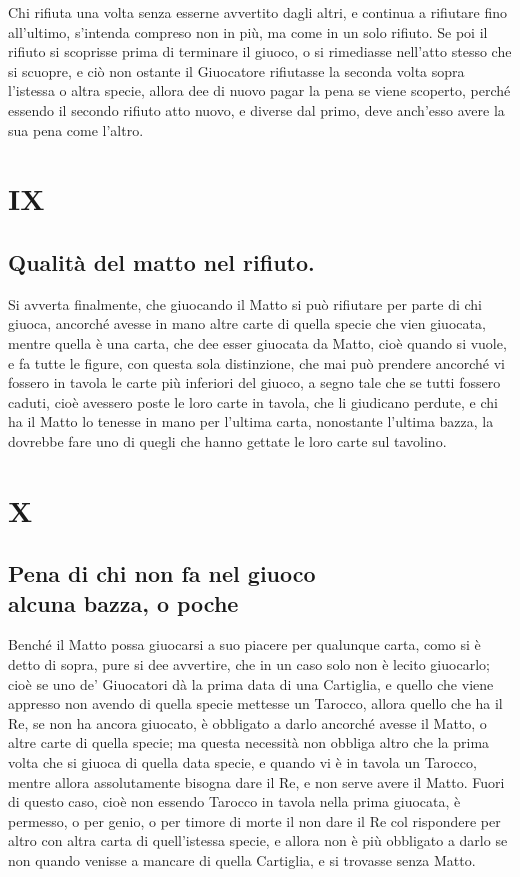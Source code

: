 \documentclass[11pt,a6paper]{article}
\begin{document}
Chi rifiuta una volta senza esserne avvertito dagli altri, e continua a rifiutare fino all'ultimo, s'intenda compreso
non in più, ma come in un solo rifiuto. Se poi il rifiuto si scoprisse prima di terminare il giuoco, o si rimediasse nell'atto stesso che si scuopre, e ciò non ostante il Giuocatore rifiutasse la seconda volta sopra l'istessa o altra specie, allora dee di nuovo pagar la pena se viene scoperto, perché essendo il secondo rifiuto atto nuovo, e diverse dal primo, deve anch'esso avere la sua pena come l'altro.

\section{IX}
\subsection*{Qualità del matto nel rifiuto.}

Si avverta finalmente, che giuocando
il Matto si può rifiutare per parte di chi giuoca, ancorché avesse in mano altre carte di quella specie che vien giuocata, mentre quella è una carta,
che dee esser giuocata da Matto, cioè quando si vuole, e fa tutte le figure, con questa sola distinzione, che mai può prendere ancorché vi fossero in tavola le carte più inferiori del giuoco, a segno tale
che se tutti fossero caduti, cioè avessero poste le loro carte in tavola, che li giudicano perdute, e chi ha il Matto lo tenesse in mano per l'ultima carta, nonostante l'ultima bazza, la dovrebbe fare uno di quegli che hanno gettate le loro carte sul tavolino.

\section{X}
\subsection*{Pena di chi non fa nel giuoco\\
  alcuna bazza, o poche}

Benché il Matto possa giuocarsi a suo
piacere per qualunque carta, como si è detto di sopra, pure si dee avvertire, che in un caso solo non è lecito giuocarlo; cioè se uno de' Giuocatori dà la prima data di una Cartiglia, e quello che viene appresso non avendo di quella specie mettesse un Tarocco, allora quello che ha il Re, se non ha ancora giuocato, è obbligato a darlo ancorché avesse il Matto, o altre carte di quella specie; ma questa necessità non obbliga altro che la prima volta che si giuoca di quella data specie, e quando vi è in tavola un Tarocco, mentre allora assolutamente bisogna dare il Re, e non serve avere il Matto. Fuori di questo caso, cioè non
essendo Tarocco in tavola nella prima
giuocata, è permesso, o per genio, o per timore di morte il non dare il Re col rispondere per altro con altra carta di quell'istessa specie, e allora non è più obbligato a darlo se non quando venisse a mancare di quella Cartiglia, e si trovasse senza Matto.
\end{document}
